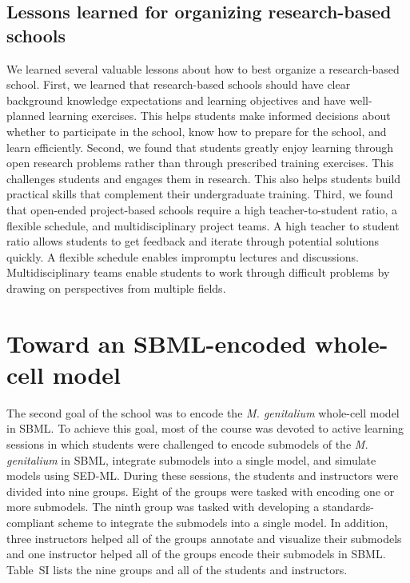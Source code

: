 \documentclass[journal,transmag]{IEEEtran}
\begin{document}
\subsection{Lessons learned for organizing research-based schools}
We learned several valuable lessons about how to best organize a research-based school. First, we learned that research-based schools should have clear background knowledge expectations and learning objectives and have well-planned learning exercises. This helps students make informed decisions about whether to participate in the school, know how to prepare for the school, and learn efficiently.
Second, we found that students greatly enjoy learning through open research problems rather than through prescribed training exercises. This challenges students and engages them in research. This also helps students build practical skills that complement their undergraduate training.
Third, we found that open-ended project-based schools require a high teacher-to-student ratio, a flexible schedule, and multidisciplinary project teams. A high teacher to student ratio allows students to get feedback and iterate through potential solutions quickly. A flexible schedule enables impromptu lectures and discussions. Multidisciplinary teams enable students to work through difficult problems by drawing on perspectives from multiple fields. 

\section{Toward an SBML-encoded whole-cell model}
The second goal of the school was to encode the \textit{M. genitalium} whole-cell model in SBML. To achieve this goal, most of the course was devoted to active learning sessions in which students were challenged to encode submodels of the \textit{M. genitalium} in SBML, integrate submodels into a single model, and simulate models using SED-ML. During these sessions, the students and instructors were divided into nine groups. Eight of the groups were tasked with encoding one or more submodels. The ninth group was tasked with developing a standards-compliant scheme to integrate the submodels into a single model. In addition, three instructors helped all of the groups annotate and visualize their submodels and one instructor helped all of the groups encode their submodels in SBML. Table~SI lists the nine groups and all of the students and instructors. 
\end{document}
